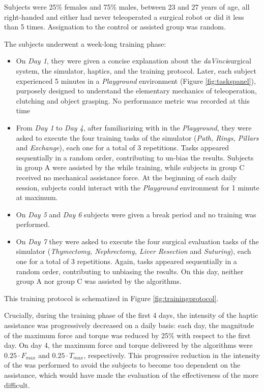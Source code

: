 \documentclass[../main.tex]{subfiles}
\begin{document}
Subjects were 25\% females and 75\% males, between 23 and 27 years of age, all right-handed and either had never teleoperated a surgical robot or did it less than 5 times. Assignation to the control or assisted group was random.

The subjects underwent a week-long training phase:
\begin{itemize}
  \item On \textit{Day 1}, they were given a concise explanation about the \textit{daVinci}\cright surgical system, the simulator, haptics, and the training protocol. Later, each subject experienced 5 minutes in a \textit{Playground} environment (Figure \ref{fig:taskspanel}), purposely designed to understand the elementary mechanics of teleoperation, clutching and object grasping. No performance metric was recorded at this time
  \item From \textit{Day 1} to \textit{Day 4}, after familiarizing with in the \textit{Playground}, they were asked to execute the four training tasks of the simulator (\textit{Path, Rings, Pillars} and \textit{Exchange}), each one for a total of 3 repetitions. Tasks appeared sequentially in a random order, contributing to un-bias the results. Subjects in group A were assisted by the \vfs while training, while subjects in group C received no mechanical assistance force. At the beginning of each daily session, subjects could interact with the \textit{Playground} environment for 1 minute at maximum.  
  \item On \textit{Day 5} and \textit{Day 6} subjects were given a break period and no training was performed.
  \item On \textit{Day 7} they were asked to execute the four surgical evaluation tasks of the simulator (\textit{Thymectomy, Nephrectomy, Liver Resection} and \textit{Suturing}), each one for a total of 3 repetitions. Again, tasks appeared sequentially in a random order, contributing to unbiasing the results. On this day, neither group A nor group C was assisted by the \vf algorithms.
\end{itemize}
This training protocol is schematized in Figure \ref{fig:trainingprotocol}. 

Crucially, during the training phase of the first 4 days, the intensity of the haptic assistance was progressively decreased on a daily basis: each day, the magnitude of the maximum force and torque was reduced by 25\% with respect to the first day. On day 4, the maximum force and torque delivered by the \vf algorithms were $0.25\cdot F_{max}$ and $0.25\cdot T_{max}$, respectively. This progressive reduction in the intensity of the \vfs was performed to avoid the subjects to become too dependent on the assistance, which would have made the evaluation of the effectiveness of the \vfs more difficult.
\end{document}
